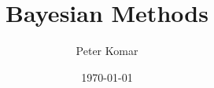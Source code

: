 \documentclass[10pt,oneside]{article}
\author{Peter Komar}
\title{Bayesian Methods}
\date{\today}
\begin{document}
\newcommand{\bel}{\begin{equation}}
\newcommand{\eel}{\end{equation}}
\newcommand{\be}{\begin{equation*}}
\newcommand{\ee}{\end{equation*}}

\newcommand{\bal}{\begin{eqnarray}}
\newcommand{\eal}{\end{eqnarray}}
\newcommand{\ba}{\begin{eqnarray*}}
\newcommand{\ea}{\end{eqnarray*}}

\newcommand{\ket}[1]{| #1 \rangle}
\newcommand{\Ket}[1]{\left| #1 \right\rangle}
\newcommand{\bra}[1]{\langle #1 |}
\newcommand{\Bra}[1]{\left\langle #1 \right|}

\newcommand{\no}{\noindent}

\newcommand{\ev}[1]{\langle #1 \rangle}
\newcommand{\Ev}[1]{\left\langle #1 \right\rangle}
\newcommand{\Tr}{\text{Tr}\,}
\newcommand{\T}{^\top}
\newcommand{\+}{^\dagger}
\newcommand{\s}{^\ast}
\newcommand{\PP}{\mathcal{P}}
\newcommand{\eqE}{= \!\!\!\!\!^{{}^{E}}\,}

\renewcommand{\d}[1]{\!d #1 \;}

\newcommand{\bE}{{\mathbf E}}
\newcommand{\bB}{{\mathbf B}}
\newcommand{\bF}{{\mathbf F}}
\newcommand{\bJ}{{\mathbf J}}
\newcommand{\bv}{{\mathbf v}}
\newcommand{\eps}{\varepsilon}
\newcommand{\br}{\mathbf r}
\newcommand{\bk}{\mathbf k}
\newcommand{\hatx}{\hat{\mathbf{x}}}
\newcommand{\haty}{\hat{\mathbf{y}}}
\newcommand{\hatz}{\hat{\mathbf{z}}}

\renewcommand{\vec}[1]{{\bf #1}}
\newcommand{\mat}[1]{{\bf #1}}
\end{document}
